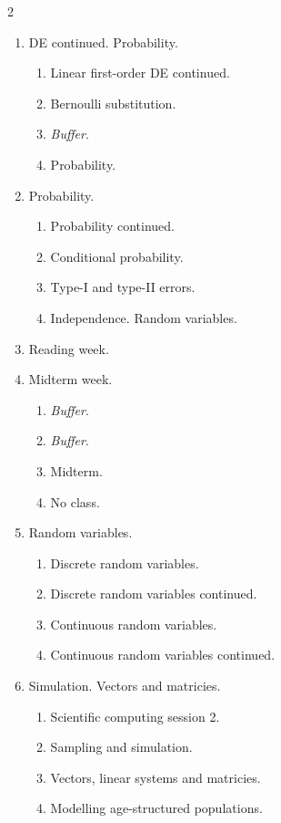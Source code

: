\documentclass[../main.tex]{subfiles}
\begin{document}
\begin{multicols}{2}
\begin{enumerate}[wide, label={\textbf{Week \arabic*}.}]
  \item DE continued.  Probability.
    \begin{enumerate}[resume]
      \item Linear first-order DE continued.
      \item Bernoulli substitution.
      \item \emph{Buffer}.
      \item Probability.
    \end{enumerate}

  \item Probability.
    \begin{enumerate}[resume]
      \item Probability continued.
      \item Conditional probability.
      \item Type-I and type-II errors.
      \item Independence.  Random variables.
    \end{enumerate}

  \item Reading week.

  \item Midterm week.
    \begin{enumerate}[resume]
      \item \emph{Buffer}.
      \item \emph{Buffer}.
      \item[{\faStar{}}] Midterm.
      \item[] No class.
    \end{enumerate}

  \item Random variables.
    \begin{enumerate}[resume]
      \item Discrete random variables.
      \item Discrete random variables continued.
      \item Continuous random variables.
      \item Continuous random variables continued.
    \end{enumerate}

  \item Simulation. Vectors and matricies.
    \begin{enumerate}[resume]
      \item Scientific computing session 2.
      \item Sampling and simulation.
      \item Vectors, linear systems and matricies.
      \item Modelling age-structured populations.
    \end{enumerate}


\end{enumerate}
\end{multicols}
\end{document}
